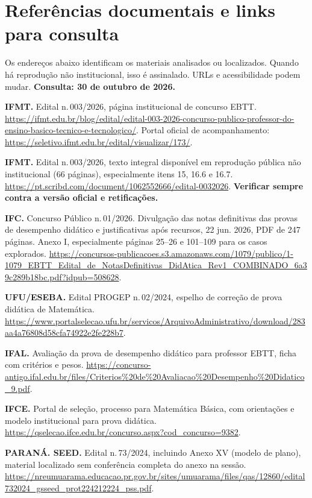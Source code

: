 \documentclass[11pt,a4paper]{article}
\begin{document}
\section{Referências documentais e links para consulta}
Os endereços abaixo identificam os materiais analisados ou localizados. Quando há reprodução não institucional, isso é assinalado. URLs e acessibilidade podem mudar. \textbf{Consulta: 30 de outubro de 2026.}
\begin{enumerate}[label={[\arabic*]},leftmargin=2em]
\item \textbf{IFMT.} Edital n.\,003/2026, página institucional de concurso EBTT. \url{https://ifmt.edu.br/blog/edital/edital-003-2026-concurso-publico-professor-do-ensino-basico-tecnico-e-tecnologico/}. Portal oficial de acompanhamento: \url{https://seletivo.ifmt.edu.br/edital/visualizar/173/}.
\item \textbf{IFMT.} Edital n.\,003/2026, texto integral disponível em reprodução pública não institucional (66 páginas), especialmente itens 15, 16.6 e 16.7. \url{https://pt.scribd.com/document/1062552666/edital-0032026}. \textbf{Verificar sempre contra a versão oficial e retificações.}
\item \textbf{IFC.} Concurso Público n.\,01/2026. Divulgação das notas definitivas das provas de desempenho didático e justificativas após recursos, 22 jun. 2026, PDF de 247 páginas. Anexo I, especialmente páginas 25--26 e 101--109 para os casos explorados. \url{https://concursos-publicacoes.s3.amazonaws.com/1079/publico/1-1079_EBTT_Edital_de_NotasDefinitivas_DidAtica_Rev1_COMBINADO_6a39c289b18bc.pdf?idpub=508628}.
\item \textbf{UFU/ESEBA.} Edital PROGEP n.\,02/2024, espelho de correção de prova didática de Matemática. \url{https://www.portalselecao.ufu.br/servicos/ArquivoAdministrativo/download/283aa4a76808d58cfa74922e2fe228b7}.
\item \textbf{IFAL.} Avaliação da prova de desempenho didático para professor EBTT, ficha com critérios e pesos. \url{https://concurso-antigo.ifal.edu.br/files/Criterios%20de%20Avaliacao%20Desempenho%20Didatico_9.pdf}.
\item \textbf{IFCE.} Portal de seleção, processo para Matemática Básica, com orientações e modelo institucional para prova didática. \url{https://qselecao.ifce.edu.br/concurso.aspx?cod_concurso=9382}.
\item \textbf{PARANÁ. SEED.} Edital n.\,73/2024, incluindo Anexo XV (modelo de plano), material localizado sem conferência completa do anexo na sessão. \url{https://nreumuarama.educacao.pr.gov.br/sites/umuarama/files/qas/12860/edital732024_gsseed_prot224212224_pss.pdf}.

\end{enumerate}
\end{document}
